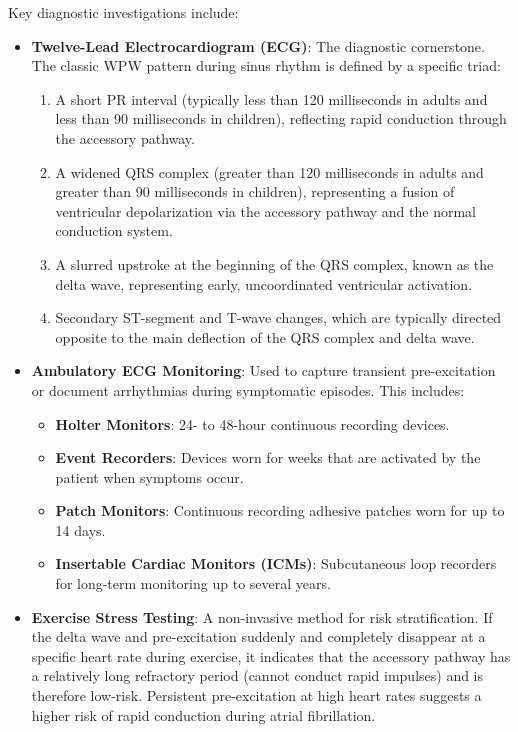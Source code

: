 Key diagnostic investigations include:
\begin{itemize}
  \item \textbf{Twelve-Lead Electrocardiogram (ECG)}: The diagnostic cornerstone. The classic WPW pattern during sinus rhythm is defined by a specific triad:
    \begin{enumerate}
      \item A short PR interval (typically less than 120 milliseconds in adults and less than 90 milliseconds in children), reflecting rapid conduction through the accessory pathway.
      \item A widened QRS complex (greater than 120 milliseconds in adults and greater than 90 milliseconds in children), representing a fusion of ventricular depolarization via the accessory pathway and the normal conduction system.
      \item A slurred upstroke at the beginning of the QRS complex, known as the delta wave, representing early, uncoordinated ventricular activation.
      \item Secondary ST-segment and T-wave changes, which are typically directed opposite to the main deflection of the QRS complex and delta wave.
    \end{enumerate}
  \item \textbf{Ambulatory ECG Monitoring}: Used to capture transient pre-excitation or document arrhythmias during symptomatic episodes. This includes:
    \begin{itemize}
      \item \textbf{Holter Monitors}: 24- to 48-hour continuous recording devices.
      \item \textbf{Event Recorders}: Devices worn for weeks that are activated by the patient when symptoms occur.
      \item \textbf{Patch Monitors}: Continuous recording adhesive patches worn for up to 14 days.
      \item \textbf{Insertable Cardiac Monitors (ICMs)}: Subcutaneous loop recorders for long-term monitoring up to several years.
    \end{itemize}
  \item \textbf{Exercise Stress Testing}: A non-invasive method for risk stratification. If the delta wave and pre-excitation suddenly and completely disappear at a specific heart rate during exercise, it indicates that the accessory pathway has a relatively long refractory period (cannot conduct rapid impulses) and is therefore low-risk. Persistent pre-excitation at high heart rates suggests a higher risk of rapid conduction during atrial fibrillation.

\end{itemize}
